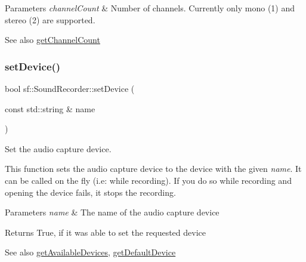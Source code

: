 \begin{DoxyParams}{Parameters}
{\em channel\+Count} & Number of channels. Currently only mono (1) and stereo (2) are supported.\\
\hline
\end{DoxyParams}
\begin{DoxySeeAlso}{See also}
\mbox{\hyperlink{classsf_1_1_sound_recorder_a610e98e7a73b316ce26b7c55234f86e9}{get\+Channel\+Count}} \begin{DoxyVerb}\end{DoxyVerb}
 
\end{DoxySeeAlso}
\mbox{\label{classsf_1_1_sound_recorder_a8eb3e473292c16e874322815836d3cd3}} 
\subsubsection{\texorpdfstring{setDevice()}{setDevice()}}
{\footnotesize\ttfamily bool sf\+::\+Sound\+Recorder\+::set\+Device (\begin{DoxyParamCaption}\item[{const std\+::string \&}]{name }\end{DoxyParamCaption})}



Set the audio capture device. 

This function sets the audio capture device to the device with the given {\itshape name}. It can be called on the fly (i.\+e\+: while recording). If you do so while recording and opening the device fails, it stops the recording.


\begin{DoxyParams}{Parameters}
{\em name} & The name of the audio capture device\\
\hline
\end{DoxyParams}
\begin{DoxyReturn}{Returns}
True, if it was able to set the requested device
\end{DoxyReturn}
\begin{DoxySeeAlso}{See also}
\mbox{\hyperlink{classsf_1_1_sound_recorder_a26198c5c11efcd61f426f326fe314afe}{get\+Available\+Devices}}, \mbox{\hyperlink{classsf_1_1_sound_recorder_ad1d450a80642dab4b632999d72a1bf23}{get\+Default\+Device}} \begin{DoxyVerb}\end{DoxyVerb}
 
\end{DoxySeeAlso}
\mbox{\label{classsf_1_1_sound_recorder_a85b7fb8a86c08b5084f8f142767bccf6}} 
